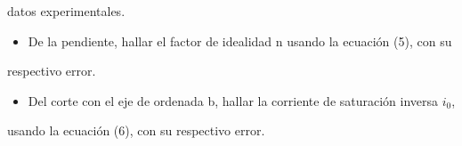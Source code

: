 \documentclass[11pt,a4paper]{article}
\begin{document}
datos experimentales.

\begin{itemize}[leftmargin=1.4em,itemsep=2pt,topsep=3pt]
  \item De la pendiente, hallar el factor de idealidad n usando la ecuación (5), con su
\end{itemize}

respectivo error.

\begin{itemize}[leftmargin=1.4em,itemsep=2pt,topsep=3pt]
  \item Del corte con el eje de ordenada b, hallar la corriente de saturación inversa $i_0$,
\end{itemize}

usando la ecuación (6), con su respectivo error.
\end{document}
